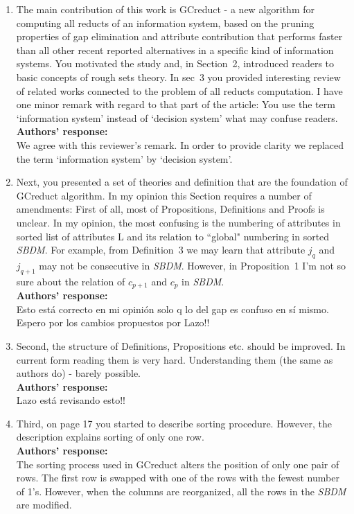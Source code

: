 \documentclass{letter}
\begin{document}
\begin{letter}{}
 \begin{enumerate}  
	\item The main contribution of this work is GCreduct - a new algorithm for computing all reducts of an information system, based on the pruning properties of gap elimination and attribute contribution that performs faster than all other recent reported alternatives in a specific kind of information systems. You motivated the study and, in Section~2, introduced readers to basic concepts of rough sets theory. In sec~3 you provided interesting review of related works connected to the problem of all reducts computation. I have one minor remark with regard to that part of the article: You use the term `information system' instead of `decision system' what may confuse readers.\\
	\textbf{Authors’ response:} \\
	We agree with this reviewer's remark. In order to provide clarity we replaced the term `information system' by `decision system'.
	
	\item Next, you presented a set of theories and definition that are the foundation of GCreduct algorithm. In my opinion this Section requires a number of amendments:
	First of all, most of Propositions, Definitions and Proofs is unclear. In my opinion, the most confusing is the numbering of attributes in sorted list of attributes L and its relation to ``global" numbering in sorted \textit{SBDM}.  For example, from Definition~3 we may learn that attribute $j_{q}$ and $j_{q+1}$ may not be consecutive in \textit{SBDM}. However, in Proposition~1 I'm not so sure about the relation of $c_{p+1}$ and $c_{p}$ in \textit{SBDM}.\\
	\textbf{Authors’ response:}\\
	Esto está correcto en mi opinión solo q lo del gap es confuso en sí mismo. Espero por los cambios propuestos por Lazo!!
	
	\item Second, the structure of  Definitions, Propositions etc. should be improved. In current form reading them is very hard. Understanding them (the same as authors do) - barely possible.\\
	\textbf{Authors’ response:}\\
	Lazo está revisando esto!!
	
	\item Third, on page 17 you started to describe sorting procedure. However, the description explains sorting of only one row.\\
	\textbf{Authors’ response:}\\
	The sorting process used in GCreduct alters the position of only one pair of rows. The first row is swapped with one of the rows with the fewest number of 1's. However, when the columns are reorganized, all the rows in the \textit{SBDM} are modified.
	

\end{enumerate}
\end{letter}
\end{document}
